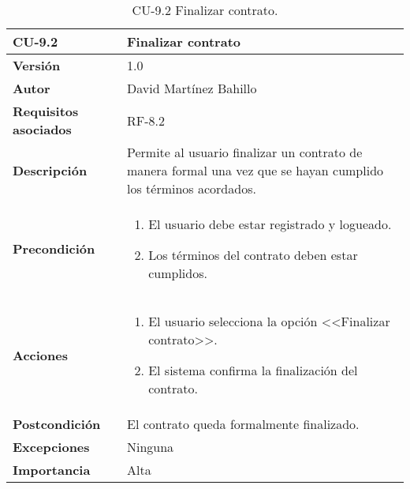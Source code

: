 \begin{table}[p]
	\centering
	\begin{tabularx}{\linewidth}{ p{} p{} }
		\toprule
		\textbf{CU-9.2}  & \textbf{Finalizar contrato}\\
		\midrule
		\textbf{Versión}              & 1.0    \\
		\textbf{Autor}                & David Martínez Bahillo \\
		\textbf{Requisitos asociados} & RF-8.2 \\
		\textbf{Descripción}          & Permite al usuario finalizar un contrato de manera formal una vez que se hayan cumplido los términos acordados. \\
		\textbf{Precondición}         &  
		\begin{enumerate}
			\item El usuario debe estar registrado y logueado.
			\item Los términos del contrato deben estar cumplidos.
		\end{enumerate}\\
		\textbf{Acciones}             &
		\begin{enumerate}
			\item El usuario selecciona la opción <<Finalizar contrato>>.
			\item El sistema confirma la finalización del contrato.
		\end{enumerate}\\
		\textbf{Postcondición}        & El contrato queda formalmente finalizado. \\
		\textbf{Excepciones}          & Ninguna \\
		\textbf{Importancia}          & Alta \\
		\bottomrule
	\end{tabularx}
	\caption{CU-9.2 Finalizar contrato.}
\end{table}


